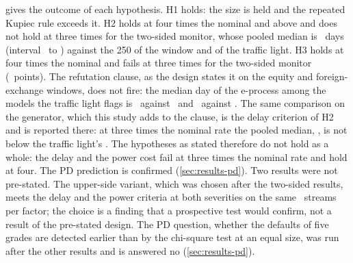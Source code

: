  gives the outcome of each hypothesis. H1 holds: the size is held and the repeated Kupiec rule exceeds it. H2 holds at four times the nominal and above and does not hold at three times for the two-sided monitor, whose pooled median is \nSeedsThreeMed\ days (interval \nSeedsThreeMedLo\ to \nSeedsThreeMedHi) against the 250 of the window and of the traffic light. H3 holds at four times the nominal and
fails at three times for the two-sided monitor (\nSeedsThreeCost\ points). The refutation clause, as the design states it on the equity and foreign-exchange windows, does not fire: the median day of the e-process among the models the traffic light flags is \nCElevenEquityNinetyLightE\ against \nCElevenEquityNinetyLightDay\ and \nCElevenFxNinetyLightE\ against \nCElevenFxNinetyLightDay. The same comparison on the generator, which this study adds to the clause, is the delay criterion of H2 and is reported there: at three times the nominal rate the pooled median, \nSeedsThreeMed, is not below the traffic light's \nSeedsThreeLight. The hypotheses as stated therefore do not hold as a whole: the delay and the power cost fail at three times the nominal rate and hold at four. The PD prediction is confirmed (\cref{sec:results-pd}). Two results were not pre-stated. The upper-side variant, which was chosen after the two-sided results, meets the delay and the power criteria at both severities on the same \nSeedsPooledN\ streams per factor; the choice is a finding that a prospective test would confirm, not a result of the pre-stated design. The PD question, whether the defaults of five grades are detected earlier than by the chi-square test at an equal size, was run after the other results and is answered no (\cref{sec:results-pd}).


